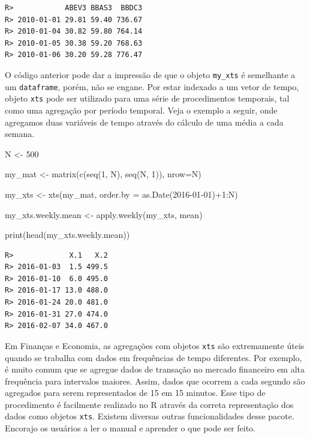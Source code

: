 \documentclass[
  11pt,
]{book}
\newenvironment{Shaded}{\begin{snugshade}}{\end{snugshade}}
\newcommand{\AttributeTok}[1]{\textcolor[rgb]{0.61,0.61,0.61}{#1}}
\newcommand{\DecValTok}[1]{\textcolor[rgb]{0.06,0.06,0.06}{#1}}
\newcommand{\FunctionTok}[1]{\textcolor[rgb]{0,0,0}{#1}}
\newcommand{\NormalTok}[1]{#1}
\newcommand{\OtherTok}[1]{\textcolor[rgb]{0.37,0.37,0.37}{#1}}
\newcommand{\SpecialCharTok}[1]{\textcolor[rgb]{0,0,0}{#1}}
\newcommand{\StringTok}[1]{\textcolor[rgb]{0.5,0.5,0.5}{#1}}
\begin{document}
\begin{verbatim}
R>            ABEV3 BBAS3  BBDC3
R> 2010-01-01 29.81 59.40 736.67
R> 2010-01-04 30.82 59.80 764.14
R> 2010-01-05 30.38 59.20 768.63
R> 2010-01-06 30.20 59.28 776.47
\end{verbatim}

O código anterior pode dar a impressão de que o objeto \texttt{my\_xts} é semelhante a um \texttt{dataframe}, porém, não se engane. Por estar indexado a um vetor de tempo, objeto \texttt{xts} pode ser utilizado para uma série de procedimentos temporais, tal como uma agregação por período temporal. Veja o exemplo a seguir, onde agregamos duas variáveis de tempo através do cálculo de uma média a cada semana.

\begin{Shaded}
\begin{Highlighting}[]
\NormalTok{N }\OtherTok{\textless{}{-}} \DecValTok{500}

\NormalTok{my\_mat }\OtherTok{\textless{}{-}} \FunctionTok{matrix}\NormalTok{(}\FunctionTok{c}\NormalTok{(}\FunctionTok{seq}\NormalTok{(}\DecValTok{1}\NormalTok{, N), }\FunctionTok{seq}\NormalTok{(N, }\DecValTok{1}\NormalTok{)), }\AttributeTok{nrow=}\NormalTok{N)}

\NormalTok{my\_xts }\OtherTok{\textless{}{-}} \FunctionTok{xts}\NormalTok{(my\_mat, }\AttributeTok{order.by =} \FunctionTok{as.Date}\NormalTok{(}\StringTok{\textquotesingle{}2016{-}01{-}01\textquotesingle{}}\NormalTok{)}\SpecialCharTok{+}\DecValTok{1}\SpecialCharTok{:}\NormalTok{N)}

\NormalTok{my\_xts.weekly.mean }\OtherTok{\textless{}{-}} \FunctionTok{apply.weekly}\NormalTok{(my\_xts, mean)}

\FunctionTok{print}\NormalTok{(}\FunctionTok{head}\NormalTok{(my\_xts.weekly.mean))}
\end{Highlighting}
\end{Shaded}

\begin{verbatim}
R>             X.1   X.2
R> 2016-01-03  1.5 499.5
R> 2016-01-10  6.0 495.0
R> 2016-01-17 13.0 488.0
R> 2016-01-24 20.0 481.0
R> 2016-01-31 27.0 474.0
R> 2016-02-07 34.0 467.0
\end{verbatim}

Em Finanças e Economia, as agregações com objetos \texttt{xts} são extremamente úteis quando se trabalha com dados em frequências de tempo diferentes. Por exemplo, é muito comum que se agregue dados de transação no mercado financeiro em alta frequência para intervalos maiores. Assim, dados que ocorrem a cada segundo são agregados para serem representados de 15 em 15 minutos. Esse tipo de procedimento é facilmente realizado no R através da correta representação dos dados como objetos \texttt{xts}. Existem diversas outras funcionalidades desse pacote. Encorajo os usuários a ler o manual e aprender o que pode ser feito.
\end{document}
